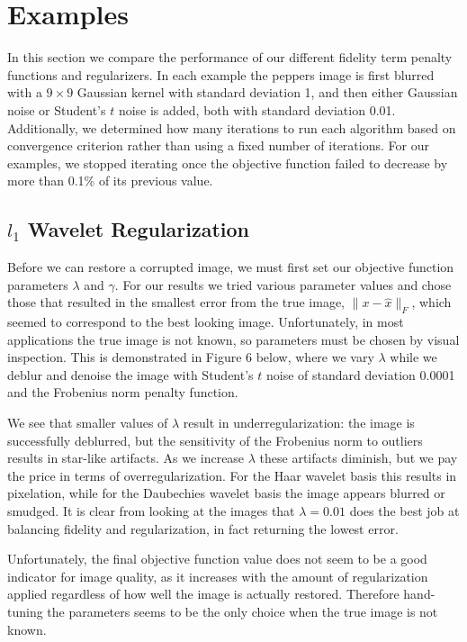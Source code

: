 \documentclass[10pt,a4paper]{article}
\begin{document}
	\newpage
	\section{Examples}
	
	In this section we compare the performance of our different fidelity term penalty functions and regularizers. In each example the peppers image is first blurred with a $9 \times 9$ Gaussian kernel with standard deviation 1, and then either Gaussian noise or Student's $t$ noise is added, both with standard deviation 0.01. Additionally, we determined how many iterations to run each algorithm based on convergence criterion rather than using a fixed number of iterations. For our examples, we stopped iterating once the objective function failed to decrease by more than 0.1\% of its previous value. 
	
	\subsection{$l_1$ Wavelet Regularization}
	
	Before we can restore a corrupted image, we must first set our objective function parameters $\lambda$ and $\gamma$. For our results we tried various parameter values and chose those that resulted in the smallest error from the true image, $\| x - \hat x \|_F$, which seemed to correspond to the best looking image. Unfortunately, in most applications the true image is not known, so parameters must be chosen by visual inspection. This is demonstrated in Figure 6 below, where we vary $\lambda$ while we deblur and denoise the image with Student's $t$ noise of standard deviation 0.0001 and the Frobenius norm penalty function. 
	
	We see that smaller values of $\lambda$ result in underregularization: the image is successfully deblurred, but the sensitivity of the Frobenius norm to outliers results in star-like artifacts. As we increase $\lambda$ these artifacts diminish, but we pay the price in terms of overregularization. For the Haar wavelet basis this results in pixelation, while for the Daubechies wavelet basis the image appears blurred or smudged. It is clear from looking at the images that $\lambda = 0.01$ does the best job at balancing fidelity and regularization, in fact returning the lowest error. 
	
	Unfortunately, the final objective function value does not seem to be a good indicator for image quality, as it increases with the amount of regularization applied regardless of how well the image is actually restored. Therefore hand-tuning the parameters seems to be the only choice when the true image is not known.  \\
	
\end{document}
